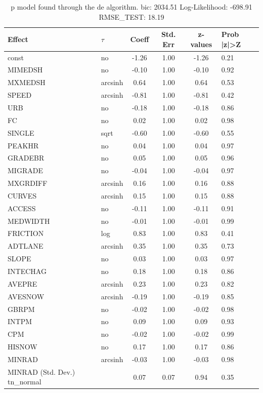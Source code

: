 \begin{table}
	\caption{p model found through the de algorithm. bic: 2034.51 Log-Likelihood: -698.91 RMSE_TEST: 18.19}
	\begin{center}
		\begin{tabular}{|l|l|c|c|c|l|}
			\hline
			Effect & $\tau$ & Coeff & Std. Err & z-values & Prob |z|>Z \\
			\hline
			const & no & -1.26 & 1.00 & -1.26 & 0.21 \\
			\hline
			MIMEDSH & no & -0.10 & 1.00 & -0.10 & 0.92 \\
			\hline
			MXMEDSH & arcsinh & 0.64 & 1.00 & 0.64 & 0.53 \\
			\hline
			SPEED & arcsinh & -0.81 & 1.00 & -0.81 & 0.42 \\
			\hline
			URB & no & -0.18 & 1.00 & -0.18 & 0.86 \\
			\hline
			FC & no & 0.02 & 1.00 & 0.02 & 0.98 \\
			\hline
			SINGLE & sqrt & -0.60 & 1.00 & -0.60 & 0.55 \\
			\hline
			PEAKHR & no & 0.04 & 1.00 & 0.04 & 0.97 \\
			\hline
			GRADEBR & no & 0.05 & 1.00 & 0.05 & 0.96 \\
			\hline
			MIGRADE & no & -0.04 & 1.00 & -0.04 & 0.97 \\
			\hline
			MXGRDIFF & arcsinh & 0.16 & 1.00 & 0.16 & 0.88 \\
			\hline
			CURVES & arcsinh & 0.15 & 1.00 & 0.15 & 0.88 \\
			\hline
			ACCESS & no & -0.11 & 1.00 & -0.11 & 0.91 \\
			\hline
			MEDWIDTH & no & -0.01 & 1.00 & -0.01 & 0.99 \\
			\hline
			FRICTION & log & 0.83 & 1.00 & 0.83 & 0.41 \\
			\hline
			ADTLANE & arcsinh & 0.35 & 1.00 & 0.35 & 0.73 \\
			\hline
			SLOPE & no & 0.03 & 1.00 & 0.03 & 0.97 \\
			\hline
			INTECHAG & no & 0.18 & 1.00 & 0.18 & 0.86 \\
			\hline
			AVEPRE & arcsinh & 0.23 & 1.00 & 0.23 & 0.82 \\
			\hline
			AVESNOW & arcsinh & -0.19 & 1.00 & -0.19 & 0.85 \\
			\hline
			GBRPM & no & -0.02 & 1.00 & -0.02 & 0.98 \\
			\hline
			INTPM & no & 0.09 & 1.00 & 0.09 & 0.93 \\
			\hline
			CPM & no & -0.02 & 1.00 & -0.02 & 0.99 \\
			\hline
			HISNOW & no & 0.17 & 1.00 & 0.17 & 0.86 \\
			\hline
			MINRAD & arcsinh & -0.03 & 1.00 & -0.03 & 0.98 \\
			\hline
			MINRAD (Std. Dev.) tn_normal &  & 0.07 & 0.07 & 0.94 & 0.35 \\
			\hline
		\end{tabular}
	\end{center}
\end{table}